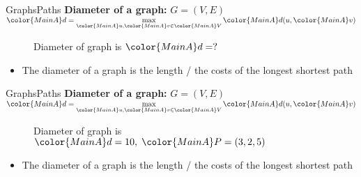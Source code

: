 \begin{frame}{Graphs}{Paths}
  \textbf{Diameter of a graph:}
         {\color{MainA}$G = (V , E)$}
  \hfill\begin{math}
    \displaystyle
    {\color{MainA}d} =
      \max\limits_{{\color{MainA}u}, {\color{MainA}v}
        \in {\color{MainA}V}}
      {\color{MainA}d(u, \color{MainA}v)}
  \end{math}
  \begin{figure}
    \begin{adjustbox}{width=0.75\linewidth}
      
    \end{adjustbox}
    \caption{{\color{MainA}Diameter} of graph is
      ${\color{MainA}d} = ?$}
  \end{figure}
  \vspace{-0.5em}
  \begin{itemize}
    \item<3->
      The {\color{MainA}diameter} of a graph is the length / the costs of
      the {\color{MainA}longest shortest path}
  \end{itemize}
\end{frame}


\begin{frame}{Graphs}{Paths}
  \textbf{Diameter of a graph:}
         {\color{MainA}$G = (V , E)$}
  \hfill\begin{math}
    \displaystyle
    {\color{MainA}d} =
      \max\limits_{{\color{MainA}u}, {\color{MainA}v}
        \in {\color{MainA}V}}
      {\color{MainA}d(u, \color{MainA}v)}
  \end{math}
  \begin{figure}
    \begin{adjustbox}{width=0.75\linewidth}
      
    \end{adjustbox}
    \caption{{\color{MainA}Diameter} of graph is
      ${\color{MainA}d} = 10, \; {\color{MainA}P} = (3,2,5)$}
  \end{figure}
  \vspace{-0.5em}
  \begin{itemize}
    \item
      The {\color{MainA}diameter} of a graph is the length / the costs of
      the {\color{MainA}longest shortest path}
  \end{itemize}
\end{frame}

